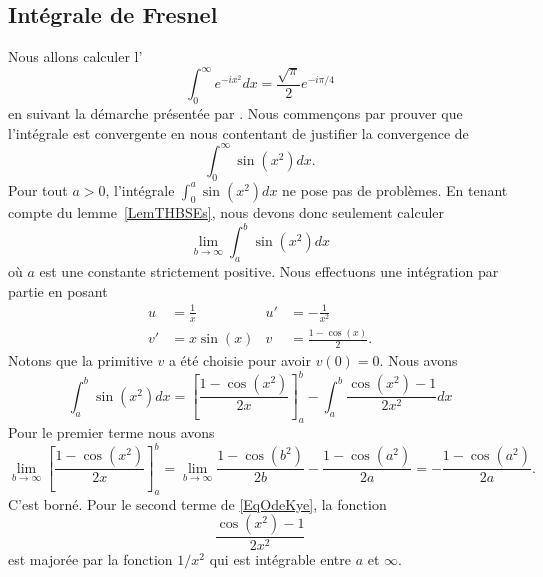 \subsection{Intégrale de Fresnel}

Nous allons calculer l'
\begin{equation}
    \int_0^{\infty} e^{-ix^2}dx=\frac{ \sqrt{\pi} }{ 2 } e^{-i\pi/4}
\end{equation}
en suivant la démarche présentée par . Nous commençons par prouver que l'intégrale est convergente en nous contentant de justifier la convergence de
\begin{equation}
    \int_0^{\infty}\sin(x^2)dx.
\end{equation}
Pour tout \( a>0\), l'intégrale \( \int_0^a\sin(x^2)dx\) ne pose pas de problèmes. En tenant compte du lemme~\ref{LemTHBSEs}, nous devons donc seulement calculer
\begin{equation}
    \lim_{b\to \infty}\int_a^b\sin(x^2)dx
\end{equation}
où \( a\) est une constante strictement positive. Nous effectuons une intégration par partie en posant
\begin{subequations}
    \begin{align}
        u&=\frac{1}{ x }&   u'&=-\frac{1}{ x^2 }\\
        v'&=x\sin(x)    & v&=\frac{ 1-\cos(x) }{2}.
    \end{align}
\end{subequations}
Notons que la primitive \( v\) a été choisie pour avoir \( v(0)=0\). Nous avons
\begin{equation}    \label{EqOdeKye}
    \int_a^b\sin(x^2)dx=\left[ \frac{ 1-\cos(x^2) }{ 2x } \right]_a^b-\int_a^b\frac{ \cos(x^2)-1 }{ 2x^2 }dx
\end{equation}
Pour le premier terme nous avons
\begin{equation}
    \lim_{b\to \infty}\left[ \frac{ 1-\cos(x^2) }{ 2x } \right]_a^b=\lim_{b\to \infty}\frac{ 1-\cos(b^2) }{ 2b }-\frac{ 1-\cos(a^2) }{ 2a }=-\frac{ 1-\cos(a^2) }{ 2a }.
\end{equation}
C'est borné. Pour le second terme de \eqref{EqOdeKye}, la fonction
\begin{equation}
    \frac{ \cos(x^2)-1 }{ 2x^2 }
\end{equation}
est majorée par la fonction \( 1/x^2\) qui est intégrable entre \( a\) et \( \infty\).


